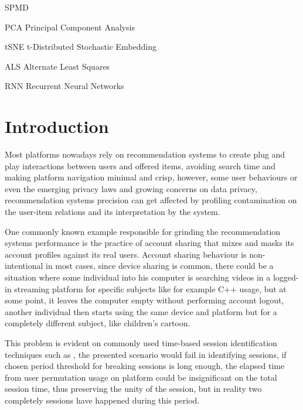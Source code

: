 \documentclass[ecp,tc,english]{iiufrgs}
\begin{document}
\listoffigures 
\listoftables 

\begin{listofabbrv}{SPMD}
    \item[PCA] Principal Component Analysis
    \item[tSNE] t-Distributed Stochastic Embedding
    \item[ALS] Alternate Least Squares
    \item[RNN] Recurrent Neural Networks
\end{listofabbrv}

\tableofcontents %


\chapter{Introduction}
Most platforms nowadays rely on recommendation systems to create plug and play interactions between users and offered items, avoiding search time and making platform navigation minimal and crisp, however, some user behaviours or even the emerging privacy laws and growing concerns on data privacy, recommendation systems precision can get affected by profiling contamination on the user-item relations  and its interpretation by the system.

One commonly known example responsible for grinding the recommendation systems performance is the practice of account sharing that mixes and masks its account profiles against its real users. Account sharing behaviour is non-intentional in most cases, since device sharing is common, there could be a situation where some individual into his computer is searching videos in a logged-in streaming platform for specific subjects like for example C++ usage, but at some point, it leaves the computer empty without performing account logout, another individual then starts using the same device and platform but for a completely different subject, like children's cartoon.

This problem is evident on commonly used time-based session identification techniques such as \cite{10.1145/2736277.2741117}, the presented scenario would fail in identifying sessions, if chosen period threshold for breaking sessions is long enough, the elapsed time from user permutation usage on platform could be insignificant on the total session time, thus preserving the unity of the session, but in reality two completely sessions have happened during this period.
\end{document}
